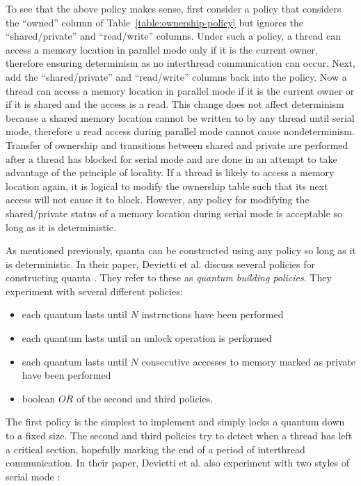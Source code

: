 To see that the above policy makes sense, first consider a policy that
considers the ``owned'' column of Table~\ref{table:ownership-policy}
but ignores the ``shared/private'' and ``read/write'' columns.  Under
such a policy, a thread can access a memory location in parallel mode
only if it is the current owner, therefore ensuring determinism as no
interthread communication can occur.  Next, add the ``shared/private''
and ``read/write'' columns back into the policy.  Now a thread can
access a memory location in parallel mode if it is the current owner
or if it is shared and the access is a read.  This change does not
affect determinism because a shared memory location cannot be written
to by any thread until serial mode, therefore a read access during
parallel mode cannot cause nondeterminism.  Transfer of ownership and
transitions between shared and private are performed after a thread
has blocked for serial mode and are done in an attempt to take
advantage of the principle of locality.  If a thread is likely to
access a memory location again, it is logical to modify the ownership
table such that its next access will not cause it to block.  However,
any policy for modifying the shared/private status of a memory
location during serial mode is acceptable so long as it is
deterministic.

As mentioned previously, quanta can be constructed using any policy so
long as it is deterministic.  In their paper, Devietti et al. discuss
several policies for constructing quanta \cite{dmp}.  They refer to
these as \emph{quantum building policies}.  They experiment with
several different policies:

\begin{itemize}
\item each quantum lasts until $N$ instructions have been performed

\item each quantum lasts until an unlock operation is performed

\item each quantum lasts until $N$ consecutive accesses to memory
  marked as private have been performed

\item boolean $OR$ of the second and third policies.
\end{itemize}

The first policy is the simplest to implement and simply locks a
quantum down to a fixed size.  The second and third policies try to
detect when a thread has left a critical section, hopefully marking
the end of a period of interthread communication.  In their paper,
Devietti et al. also experiment with two styles of serial mode
\cite{dmp}:

